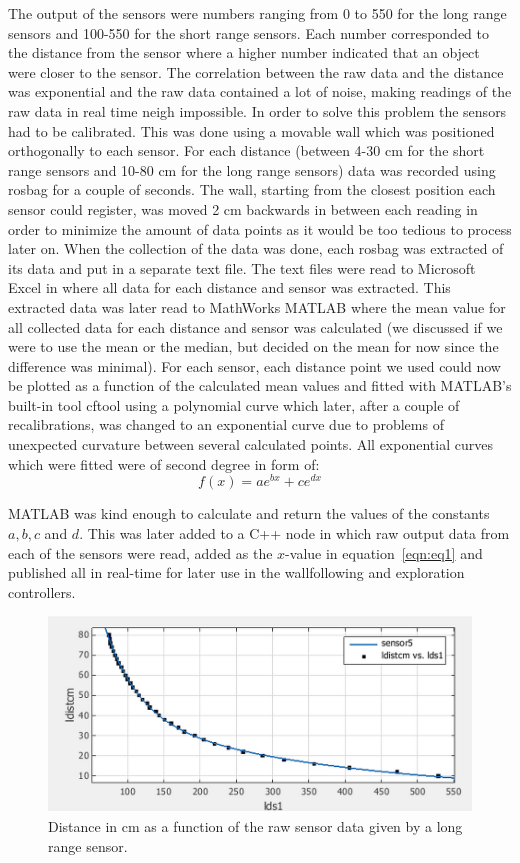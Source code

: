 The output of the sensors were numbers ranging from 0 to 550 for the long range
sensors and 100-550 for the short range sensors. Each number corresponded to the
distance from the sensor where a higher number indicated that an object were
closer to the sensor. The correlation between the raw data and the distance was
exponential and the raw data contained a lot of noise, making readings of the
raw data in real time neigh impossible.  In order to solve this problem the
sensors had to be calibrated. This was done using a movable wall which was
positioned orthogonally to each sensor. For each distance (between 4-30 cm for
the short range sensors and 10-80 cm for the long range sensors) data was
recorded using rosbag for a couple of seconds. The wall, starting from the
closest position each sensor could register, was moved 2 cm backwards in between
each reading in order to minimize the amount of data points as it would be too
tedious to process later on.  When the collection of the data was done, each
rosbag was extracted of its data and put in a separate text file. The text files
were read to Microsoft Excel in where all data for each distance and sensor was
extracted. This extracted data was later read to MathWorks MATLAB where the mean
value for all collected data for each distance and sensor was calculated (we
discussed if we were to use the mean or the median, but decided on the mean for
now since the difference was minimal). For each sensor, each distance point we
used could now be plotted as a function of the calculated mean values and fitted
with MATLAB’s built-in tool cftool using a polynomial curve which later, after a
couple of recalibrations, was changed to an exponential curve due to problems of
unexpected curvature between several calculated points. All exponential curves
which were fitted were of second degree in form of: 
\begin{equation}
  \label{eqn:eq1}
  f(x) = ae^{bx}+ce^{dx}    
\end{equation}


MATLAB was kind enough to calculate and return the values of the constants $a,
b, c$ and $d$. This was later added to a C++ node in which raw output data from
each of the sensors were read, added as the $x$-value in equation~\ref{eqn:eq1}
and published all in real-time for later use in the wallfollowing and
exploration controllers.

\begin{figure}
  \centering
  \includegraphics[width=\linewidth]{images/sensorcalib.png}  
  \caption{Distance in cm as a function of the raw sensor data given by a long range sensor.}
  \label{fig:sensorcalib}
\end{figure}

